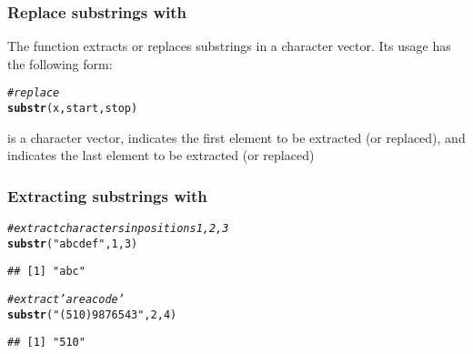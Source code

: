 \documentclass[12pt]{beamer}\usepackage[]{graphicx}\usepackage[]{color}
\makeatletter
\newcommand{\hlnum}[1]{\textcolor[rgb]{0.686,0.059,0.569}{#1}}%
\newcommand{\hlstr}[1]{\textcolor[rgb]{0.192,0.494,0.8}{#1}}%
\newcommand{\hlcom}[1]{\textcolor[rgb]{0.678,0.584,0.686}{\textit{#1}}}%
\newcommand{\hlstd}[1]{\textcolor[rgb]{0.345,0.345,0.345}{#1}}%
\newcommand{\hlkwd}[1]{\textcolor[rgb]{0.737,0.353,0.396}{\textbf{#1}}}%
\newenvironment{kframe}{%
 \def\at@end@of@kframe{}%
 \ifinner\ifhmode%
  \def\at@end@of@kframe{\end{minipage}}%
  \begin{minipage}{\columnwidth}%
 \fi\fi%
 \def\FrameCommand##1{\hskip\@totalleftmargin \hskip-\fboxsep
 \colorbox{shadecolor}{##1}\hskip-\fboxsep
     \hskip-\linewidth \hskip-\@totalleftmargin \hskip\columnwidth}%
 \MakeFramed {\advance\hsize-\width
   \@totalleftmargin\z@ \linewidth\hsize
   \@setminipage}}%
 {\par\unskip\endMakeFramed%
 \at@end@of@kframe}
\newenvironment{knitrout}{}{} %
\makeatother
\begin{document}

\begin{frame}[fragile]
\frametitle{Replace substrings with }

The function  extracts or replaces substrings in a character vector. Its usage has the following form:
\begin{knitrout}\footnotesize
{}\color{fgcolor}\begin{kframe}
\begin{alltt}
\hlcom{# replace}
\hlkwd{substr}\hlstd{(x, start, stop)}
\end{alltt}
\end{kframe}
\end{knitrout}

 is a character vector,  indicates the first element to be extracted (or replaced), and  indicates the last element to be extracted (or replaced)

\end{frame}


\begin{frame}[fragile]
\frametitle{Extracting substrings with }

\begin{knitrout}\footnotesize
{}\color{fgcolor}\begin{kframe}
\begin{alltt}
\hlcom{# extract characters in positions 1, 2, 3}
\hlkwd{substr}\hlstd{(}\hlstr{"abcdef"}\hlstd{,} \hlnum{1}\hlstd{,} \hlnum{3}\hlstd{)}
\end{alltt}
\begin{verbatim}
## [1] "abc"
\end{verbatim}
\begin{alltt}
\hlcom{# extract 'area code' }
\hlkwd{substr}\hlstd{(}\hlstr{"(510) 987 6543"}\hlstd{,} \hlnum{2}\hlstd{,} \hlnum{4}\hlstd{)}
\end{alltt}
\begin{verbatim}
## [1] "510"
\end{verbatim}
\end{kframe}
\end{knitrout}

\end{frame}

\end{document}
